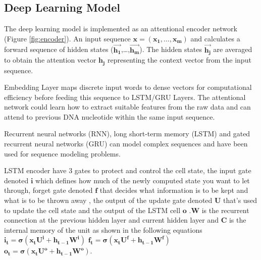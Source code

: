 \documentclass[conference]{IEEEtran}
\begin{document}

\subsection{Deep Learning Model}
The deep learning model is implemented as an attentional encoder network (Figure \ref{fig:encoder}). An input sequence  $\mathbf{x = (x_{1} , \ldots{} , x_{m} )}$  and calculates a forward sequence of hidden states  ($\mathbf{\overrightarrow{h_{1}}}$,\ldots{},$\mathbf{ \overrightarrow{h_{m}}}$). The hidden states $\mathbf{\overrightarrow{h_{j}}}$  are averaged to obtain the attention vector $\mathbf{h_{j}}$ representing the context vector from the input sequence.

Embedding Layer maps discrete input words to dense vectors for computational efficiency before feeding this sequence to LSTM/GRU Layers. The attentional network could learn how to extract suitable features from the raw data and can attend to previous DNA nucleotide within the same input sequence. 

Recurrent neural networks (RNN), long short-term memory (LSTM) \cite{hochreiter1997long} and gated recurrent neural networks (GRU) \cite{chung2014empirical} can model complex sequences and have been used for sequence modeling problems.


LSTM encoder have 3 gates to protect and control the cell state, the input gate denoted $\mathbf{i}$ which defines how much of the newly computed state you want to let through, forget gate denoted $\mathbf{f}$ that decides what information is to be kept and what is to be thrown away ,  the output of the update gate denoted $\mathbf{U}$ that's used to update the cell state and the output of the LSTM cell $\mathbf{o}$ .$\mathbf{W}$ is the recurrent connection at the previous hidden layer and current hidden layer and $\mathbf{C}$ is the internal memory of the unit  as shown in the following equations \newline
$\mathbf{i_{t}=\sigma(x_{t}U^i + h_{t-1}W^i)}$ \newline
$\mathbf{f_{t}=\sigma(x_{t}U^f + h_{t-1}W^f)}$ \newline
$\mathbf{o_{t}=\sigma(x_{t}U^o + h_{t-1}W^o)}$. 
\end{document}
